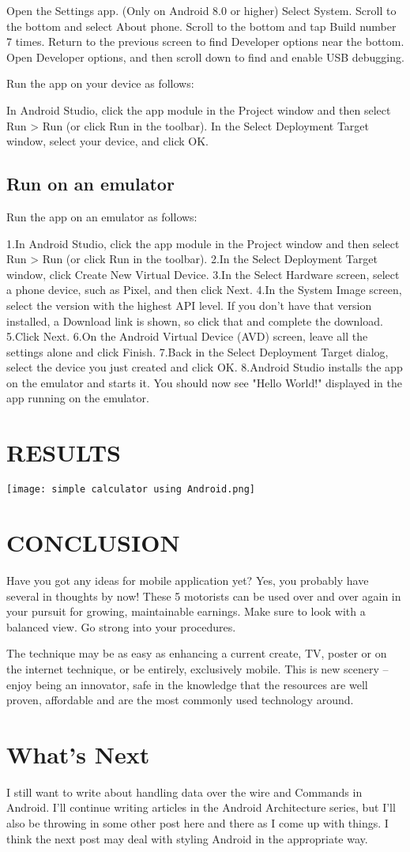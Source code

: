 \documentclass{fisatproject}
\begin{document}
Open the Settings app.
(Only on Android 8.0 or higher) Select System.
Scroll to the bottom and select About phone.
Scroll to the bottom and tap Build number 7 times.
Return to the previous screen to find Developer options near the bottom.
Open Developer options, and then scroll down to find and enable USB debugging.

Run the app on your device as follows:

In Android Studio, click the app module in the Project window and then select Run > Run (or click Run  in the toolbar).
In the Select Deployment Target window, select your device, and click OK.
\section{Run on an emulator}
Run the app on an emulator as follows:

1.In Android Studio, click the app module in the Project window and then select Run > Run (or click Run  in the toolbar).
2.In the Select Deployment Target window, click Create New Virtual Device.
3.In the Select Hardware screen, select a phone device, such as Pixel, and then click Next.
4.In the System Image screen, select the version with the highest API level. If you don't have that version installed, a Download link is shown, so click that and complete the download.
5.Click Next.
6.On the Android Virtual Device (AVD) screen, leave all the settings alone and click Finish.
7.Back in the Select Deployment Target dialog, select the device you just created and click OK.
8.Android Studio installs the app on the emulator and starts it. You should now see "Hello World!" displayed in the app running on the emulator.
\chapter{RESULTS}
\texttt{[image: simple calculator using Android.png]} 


\chapter{CONCLUSION}

Have you got any ideas for mobile application yet? Yes, you probably have several in thoughts by now! These 5 motorists can be used over and over again in your pursuit for growing, maintainable earnings. Make sure to look with a balanced view. Go strong into your procedures.

The technique may be as easy as enhancing a current create, TV, poster or on the internet technique, or be entirely, exclusively mobile. This is new scenery – enjoy being an innovator, safe in the knowledge that the resources are well proven, affordable and are the most commonly used technology around.
\chapter{What's Next}
I still want to write about handling data over the wire and Commands in Android. I’ll continue writing articles in the Android Architecture series, but I’ll also be throwing in some other post here and there as I come up with things. I think the next post may deal with styling Android in the appropriate way.
\end{document}
